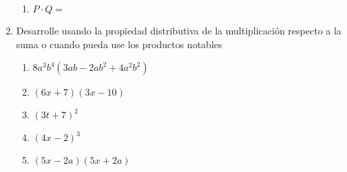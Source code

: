\documentclass[letterpaper,fleqn]{article}
\begin{document}
\begin{enumerate}
\begin{enumerate}
 \item $P\cdot Q=$
\end{enumerate}
\item Desarrolle usando la propiedad distributiva de la multiplicación respecto a la suma o cuando pueda use los productos notables
\begin{enumerate}
 \item $8a^{3}b^{4}(3ab-2ab^{2}+4a^{2}b^{2})$
 \item $(6x+7)(3x-10)$
 \item $(3t+7)^{2}$
 \item $(4x-2)^{3}$
 \item $(5x-2a)(5x+2a)$
\end{enumerate}
 \end{enumerate}
\end{document}
